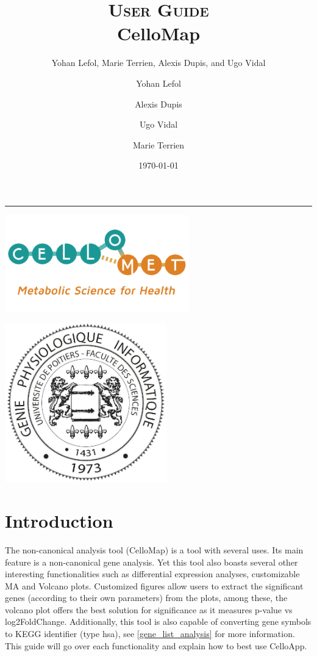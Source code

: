 \documentclass[11pt]{article}
\author{Yohan Lefol, Marie Terrien, Alexis Dupis, and Ugo Vidal}
\title{
\textsc{User Guide}\\[2.6cm]
{\LARGE \bfseries CelloMap}
}
\author{
Yohan Lefol
\and 
Alexis Dupis
\and
Ugo Vidal
\and
Marie Terrien
}
\date{
\today
}
\begin{document}
\maketitle
\hrule
\begin{center}
\includegraphics[width = 8cm]{logo-CELLOMET-a.png}
\end{center}

\begin{center}
\includegraphics[width = 7cm]{Logo-Master-GPhy.png}
\end{center}
\thispagestyle{empty}


\tableofcontents


\newpage
\section{Introduction \label{intro}}
The non-canonical analysis tool (CelloMap) is a tool with several uses. Its main feature is a non-canonical gene analysis. Yet this tool also boasts several other interesting functionalities such as differential expression analyses, customizable MA and Volcano plots. Customized figures allow users to extract the significant genes (according to their own parameters) from the plots, among these, the volcano plot offers the best solution for significance as it measures p-value vs log2FoldChange. Additionally, this tool is also capable of converting gene symbols to \acrshort{KEGG} identifier (type \acrshort{hsa}), see \autoref{gene_list_analysis} for more information.
This guide will go over each functionality and explain how to best use CelloApp.
\end{document}
